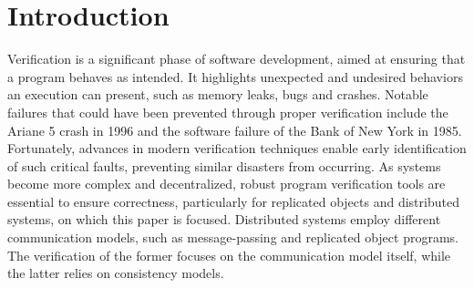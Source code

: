 \documentclass[12pt]{article}
\begin{document}
\begin{titlepage}
  \centering
  \vspace*{\fill} %
  \begin{minipage}{0.8\textwidth} %
    \begin{abstract}
      As distributed systems grow increasingly complex, verifying the reliability of their behavior and program correctness becomes essential. Verification provides formal guarantees that a program behaves as intended under specific system assumptions.

In this work, we define a formal framework for consistency verification in replicated data systems and identify its key constraints. Within this context, we prove that the consistency verification problem is decidable. We also propose a method to encode execution traces as finite words, enabling the concrete verification of trace properties. This approach enables verification of consistency for any execution trace over finite data domains.

    \end{abstract}
  \end{minipage}
  \vspace*{\fill} %
\end{titlepage}


\newpage

\tableofcontents  %
\newpage

\section{Introduction}

%

Verification is a significant phase of software development, aimed at ensuring that a program behaves as intended. It highlights unexpected and undesired behaviors an execution can present, such as memory leaks, bugs and crashes. Notable failures that could have been prevented through proper verification include the Ariane 5 crash in 1996 and the software failure of the Bank of New York in 1985. Fortunately, advances in modern verification techniques enable early identification of such critical faults, preventing similar disasters from occurring. As systems become more complex and decentralized, robust program verification tools are essential to ensure correctness, particularly for replicated objects and distributed systems, on which this paper is focused. Distributed systems employ different communication models, such as message-passing and replicated object programs. The verification of the former focuses on the communication model itself, while the latter relies on consistency models.
\end{document}
